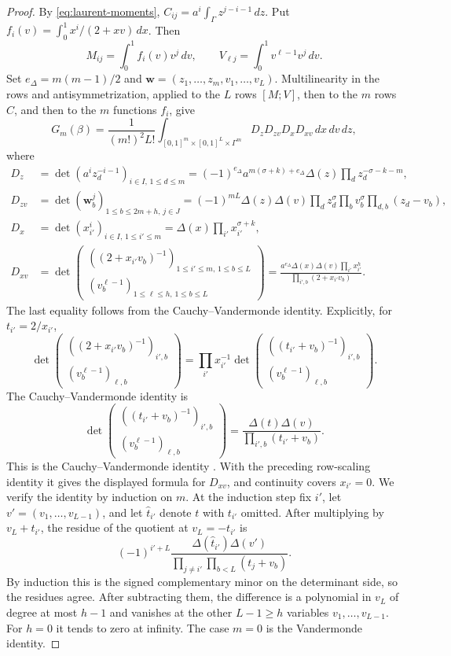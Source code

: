 \documentclass{amsart}
\numberwithin{equation}{section}
\numberwithin{table}{section}
\begin{document}
\begin{proof}
By \eqref{eq:laurent-moments},
$C_{ij}=a^i\int_\Gamma z^{j-i-1}\,dz$.
Put $f_i(v)=\int_0^1x^i/(2+xv)\,dx$. Then
\[
M_{ij}=\int_0^1f_i(v)v^j\,dv,\qquad
V_{\ell j}=\int_0^1v^{\ell-1}v^j\,dv.
\]
Set $e_\Delta=m(m-1)/2$ and
$\mathbf w=(z_1,\ldots,z_m,v_1,\ldots,v_L)$.
Multilinearity in the rows and antisymmetrization, applied to the $L$ rows
$[M;V]$, then to the $m$ rows $C$, and then to the $m$ functions $f_i$, give
\begin{equation*}
G_m(\beta)=\frac1{(m!)^2L!}
\int_{[0,1]^m\times[0,1]^L\times\Gamma^m}
D_zD_{zv}D_xD_{xv}\,dx\,dv\,dz,
\end{equation*}
where
\begin{align*}
D_z&=\det(a^iz_d^{-i-1})_{i\in I,\,1\le d\le m}
 =(-1)^{e_\Delta}a^{m(\sigma+k)+e_\Delta}\Delta(z)\prod_dz_d^{-\sigma-k-m},\\
D_{zv}&=\det(\mathbf w_b^j)_{1\le b\le 2m+h,\,j\in J}
=(-1)^{mL}\Delta(z)\Delta(v)
  \prod_dz_d^\sigma\prod_bv_b^\sigma\prod_{d,b}(z_d-v_b),\\
D_x&=\det(x_{i'}^i)_{i\in I,\,1\le i'\le m}
 =\Delta(x)\prod_{i'}x_{i'}^{\sigma+k},\\
D_{xv}&=\det\begin{pmatrix}
((2+x_{i'}v_b)^{-1})_{1\le i'\le m,\,1\le b\le L}\\
(v_b^{\ell-1})_{1\le\ell\le h,\,1\le b\le L}
\end{pmatrix}
 =\frac{a^{e_\Delta}\Delta(x)\Delta(v)\prod_{i'}x_{i'}^h}
{\prod_{i',b}(2+x_{i'}v_b)}.
\end{align*}
The last equality follows from the Cauchy--Vandermonde identity. Explicitly,
for $t_{i'}=2/x_{i'}$,
\[
\det\begin{pmatrix}((2+x_{i'}v_b)^{-1})_{i',b}\\(v_b^{\ell-1})_{\ell,b}\end{pmatrix}
=\prod_{i'}x_{i'}^{-1}
\det\begin{pmatrix}((t_{i'}+v_b)^{-1})_{i',b}\\(v_b^{\ell-1})_{\ell,b}\end{pmatrix}.
\]
The Cauchy--Vandermonde identity is
\[
\det\begin{pmatrix}
((t_{i'}+v_b)^{-1})_{i',b}\\(v_b^{\ell-1})_{\ell,b}
\end{pmatrix}
=\frac{\Delta(t)\Delta(v)}{\prod_{i',b}(t_{i'}+v_b)}.
\]
This is the Cauchy--Vandermonde identity \cite{Krat}. With the preceding
row-scaling identity it gives the displayed formula for $D_{xv}$, and
continuity covers $x_{i'}=0$.
We verify the identity by induction on $m$. At the induction
step fix $i'$, let $v'=(v_1,\ldots,v_{L-1})$, and let $\widehat t_{i'}$
denote $t$ with $t_{i'}$ omitted. After multiplying by $v_L+t_{i'}$, the
residue of the quotient at $v_L=-t_{i'}$ is
\[
 (-1)^{i'+L}
 \frac{\Delta(\widehat t_{i'})\Delta(v')}
 {\prod_{j\ne i'}\prod_{b<L}(t_j+v_b)}.
\]
By induction this is the signed complementary minor on the determinant
side, so the residues agree. After subtracting them, the difference is a
polynomial in $v_L$ of degree at most $h-1$ and vanishes at the other
$L-1\ge h$ variables $v_1,\ldots,v_{L-1}$. For $h=0$ it tends to zero at
infinity. The case $m=0$ is the Vandermonde identity.


\end{proof}
\end{document}
